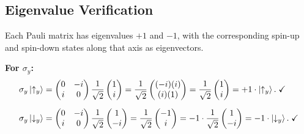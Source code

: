 \documentclass[11pt,a4paper]{article}
\theoremstyle{definition}
\theoremstyle{plain}
\theoremstyle{remark}
\begin{document}
\subsection{Eigenvalue Verification}

Each Pauli matrix has eigenvalues $+1$ and $-1$, with the corresponding spin-up and spin-down states along that axis as eigenvectors.

\textbf{For $\sigma_y$:}
\begin{align}
    \sigma_y\ket{\uparrow_y} &= \begin{pmatrix}0&-i\\i&0\end{pmatrix}\frac{1}{\sqrt{2}}\begin{pmatrix}1\\i\end{pmatrix} = \frac{1}{\sqrt{2}}\begin{pmatrix}(-i)(i)\\(i)(1)\end{pmatrix} = \frac{1}{\sqrt{2}}\begin{pmatrix}1\\i\end{pmatrix} = +1\cdot\ket{\uparrow_y}. \;\checkmark \\[6pt]
    \sigma_y\ket{\downarrow_y} &= \begin{pmatrix}0&-i\\i&0\end{pmatrix}\frac{1}{\sqrt{2}}\begin{pmatrix}1\\-i\end{pmatrix} = \frac{1}{\sqrt{2}}\begin{pmatrix}-1\\i\end{pmatrix} = -1\cdot\frac{1}{\sqrt{2}}\begin{pmatrix}1\\-i\end{pmatrix} = -1\cdot\ket{\downarrow_y}. \;\checkmark
\end{align}
\end{document}
